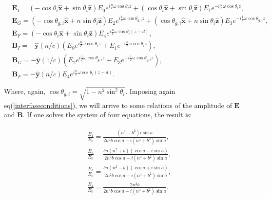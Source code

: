 \begin{equation}
	\begin{split}
		&\mathbf{E}_{I}=\left(-\cos \theta_{i} \hat{\mathbf{x}}+\sin \theta_{i} \hat{\mathbf{z}}\right) E_{0} e^{i \frac{n}{c} \omega \cos \theta_{i} z}+\left(\cos \theta_{i} \hat{\mathbf{x}}+\sin \theta_{i} \hat{\mathbf{z}}\right) E_{1} e^{-i \frac{n}{c} \omega \cos \theta_{i} z},\\
		&\mathbf{E}_{G}=\left(-\cos \theta_{g, i} \hat{\mathbf{x}}+n \sin \theta_{i} \hat{\mathbf{z}}\right) E_{2} e^{i \frac{1}{c} \omega \cos \theta_{g, i} z}+\left(\cos \theta_{g, i} \hat{\mathbf{x}}+n \sin \theta_{i} \hat{\mathbf{z}}\right) E_{3} e^{-i \frac{1}{c} \omega \cos \theta_{g, i} z},\\
		&\mathbf{E}_{F}=\left(-\cos \theta_{i} \hat{\mathbf{x}}+\sin \theta_{i} \hat{\mathbf{z}}\right) E_{4} e^{i \frac{n}{c} \omega \cos \theta_{i}(z-d)},\\
		&\mathbf{B}_{I}=-\hat{\mathbf{y}}(n / c)\left(E_{0} e^{i \frac{n}{c} \omega \cos \theta_{i} z}+E_{1} e^{-i \frac{n}{c} \omega \cos \theta_{i} z}\right),\\
		&\mathbf{B}_{G}=-\hat{\mathbf{y}}(1 / c)\left(E_{2} e^{i \frac{1}{c} \omega \cos \theta_{g, i} z}+E_{3} e^{-i \frac{1}{c} \omega \cos \theta_{g, i} z}\right),\\
		&\mathbf{B}_{F}=-\hat{\mathbf{y}}(n / c) E_{4} e^{i \frac{n}{c} \omega \cos \theta_{i}(z-d)}.
	\end{split}
\end{equation}

Where, again, $\cos \theta_{g, i}=\sqrt{1-n^{2} \sin ^{2} \theta_{i}}.$ Imposing again eq(\ref{interfaseconditions}), we will arrive to some relations of the amplitude of $\mathbf{E}$ and $\mathbf{B}$. If one solves the system of four equations, the result is:

\begin{equation}
	\begin{split}
		\begin{aligned}
			&\frac{E_{1}}{E_{0}}=\frac{\left(n^{4}-b^{2}\right) i \sin a}{2 n^{2} b \cos a-i\left(n^{4}+b^{2}\right) \sin a}, \\
			&\frac{E_{2}}{E_{0}}=\frac{b n\left(n^{2}+b\right)(\cos a-i \sin a)}{2 n^{2} b \cos a-i\left(n^{4}+b^{2}\right) \sin a},\\
			&\frac{E_{3}}{E_{0}}=\frac{b n\left(n^{2}-b\right)(\cos a+i \sin a)}{2 n^{2} b \cos a-i\left(n^{4}+b^{2}\right) \sin a},\\
			&\frac{E_{4}}{E_{0}}=\frac{2 n^{2} b}{2 n^{2} b \cos a-i\left(n^{4}+b^{2}\right) \sin a}.
		\end{aligned}
	\end{split}
\end{equation}

